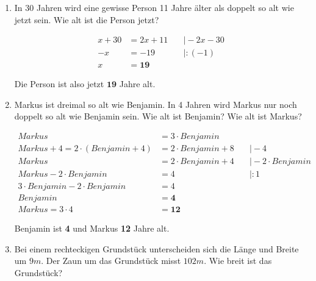 \documentclass[a4paper,10pt]{article} %
\begin{document}
\begin{enumerate}
    \[
      \begin{aligned}
        Lisa + Thomas &= 31 \\
        Lisa &= Thomas + 5 \\
        Thomas + 5 + Thomas &= 31 &\quad\big| - 5 \\
        2 \cdot Thomas &= 26 &\quad\big| : 2 \\
        Thomas &= \mathbf{13} \\
        Lisa = 13 + 5 &= \mathbf{18}
      \end{aligned}
    \]

    Lisa ist \textbf{18} und Thomas \textbf{13} Jahre alt.

  \item In 30 Jahren wird eine gewisse Person 11 Jahre älter als doppelt so alt wie jetzt sein.
    Wie alt ist die Person jetzt?

    \[
      \begin{aligned}
        x + 30 &= 2x + 11 &\quad\big| - 2x - 30 \\
        -x &= -19 &\quad\big| : (-1) \\
        x &= \mathbf{19}
      \end{aligned}
    \]

    Die Person ist also jetzt \(\mathbf{19}\) Jahre alt.

  \item Markus ist dreimal so alt wie Benjamin. In 4 Jahren wird Markus nur noch
    doppelt so alt wie Benjamin sein. Wie alt ist Benjamin? Wie alt ist Markus?

    \[
      \begin{aligned}
        Markus &= 3 \cdot Benjamin \\
        Markus + 4 = 2 \cdot (Benjamin + 4) &= 2 \cdot Benjamin + 8 &\quad\big| - 4 \\
        Markus &= 2 \cdot Benjamin + 4 &\quad\big| - 2 \cdot Benjamin \\
        Markus - 2 \cdot Benjamin &= 4 &\quad\big| : 1 \\
        3 \cdot Benjamin - 2 \cdot Benjamin &= 4 \\
        Benjamin &= \mathbf{4} \\
        Markus = 3 \cdot 4 &= \mathbf{12}
      \end{aligned}
    \]

    Benjamin ist \textbf{4} und Markus \textbf{12} Jahre alt.

  \item Bei einem rechteckigen Grundstück unterscheiden sich die Länge und Breite
    um \(9m\). Der Zaun um das Grundstück misst \(102m\). Wie breit ist das Grundstück?


\end{enumerate}
\end{document}
